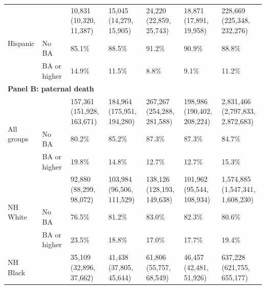 \begin{threeparttable}
\begin{tabular}{lllllll}
\cmidrule(lr){1-7}
\multirow{3}{*}{Hispanic} & \raisebox{0.5\height}{\textbf{Total}} & \shortstack[l]{10,831 \\ (10,320, 11,387)} & \shortstack[l]{15,045 \\ (14,279, 15,905)} & \shortstack[l]{24,220 \\ (22,859, 25,743)} & \shortstack[l]{18,871 \\ (17,891, 19,958)} & \shortstack[l]{228,669 \\ (225,348, 232,276)} \\
\cmidrule(lr){2-7}
 & No BA & 85.1\% & 88.5\% & 91.2\% & 90.9\% & 88.8\% \\
 & BA or higher & 14.9\% & 11.5\% & 8.8\% & 9.1\% & 11.2\% \\
\midrule
\multicolumn{7}{l}{\textbf{Panel B: paternal death}} \\
\multirow{3}{*}{All groups} & \raisebox{0.5\height}{\textbf{Total}} & \shortstack[l]{157,361 \\ (151,928, 163,671)} & \shortstack[l]{184,964 \\ (175,951, 194,280)} & \shortstack[l]{267,267 \\ (254,288, 281,588)} & \shortstack[l]{198,986 \\ (190,402, 208,224)} & \shortstack[l]{2,831,466 \\ (2,797,833, 2,872,683)} \\
\cmidrule(lr){2-7}
 & No BA & 80.2\% & 85.2\% & 87.3\% & 87.3\% & 84.7\% \\
 & BA or higher & 19.8\% & 14.8\% & 12.7\% & 12.7\% & 15.3\% \\
\cmidrule(lr){1-7}
\multirow{3}{*}{NH White} & \raisebox{0.5\height}{\textbf{Total}} & \shortstack[l]{92,880 \\ (88,299, 98,072)} & \shortstack[l]{103,984 \\ (96,506, 111,529)} & \shortstack[l]{138,126 \\ (128,193, 149,638)} & \shortstack[l]{101,962 \\ (95,544, 108,934)} & \shortstack[l]{1,574,885 \\ (1,547,341, 1,608,230)} \\
\cmidrule(lr){2-7}
 & No BA & 76.5\% & 81.2\% & 83.0\% & 82.3\% & 80.6\% \\
 & BA or higher & 23.5\% & 18.8\% & 17.0\% & 17.7\% & 19.4\% \\
\cmidrule(lr){1-7}
\multirow{3}{*}{NH Black} & \raisebox{0.5\height}{\textbf{Total}} & \shortstack[l]{35,109 \\ (32,896, 37,662)} & \shortstack[l]{41,438 \\ (37,805, 45,644)} & \shortstack[l]{61,806 \\ (55,757, 68,549)} & \shortstack[l]{46,457 \\ (42,481, 51,926)} & \shortstack[l]{637,228 \\ (621,755, 655,177)} \\

\end{tabular}
\end{threeparttable}
